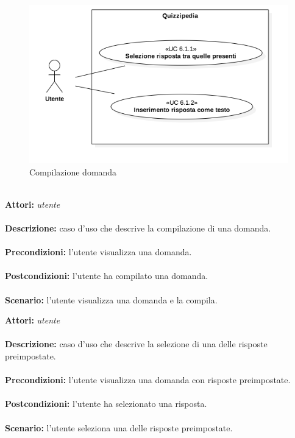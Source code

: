 \documentclass[a4paper,11pt]{article}
\begin{document}
\begin{figure}[h!]
\centering
\includegraphics[scale=0.6]{../immagini/UC6_2.png}
\caption{Compilazione domanda}
\end{figure}
\ \\
\textbf{Attori:} \textit{utente}
\\ \\
\textbf{Descrizione:} caso d'uso che descrive la compilazione di una domanda.\\
\\
\textbf{Precondizioni:} l'utente visualizza una domanda.\\
\\
\textbf{Postcondizioni:} l'utente ha compilato una domanda.\\
\\
\textbf{Scenario:} l’utente visualizza una domanda e la compila.\\



\textbf{Attori:} \textit{utente}
\\ \\
\textbf{Descrizione:} caso d'uso che descrive la selezione di una delle risposte preimpostate.\\
\\
\textbf{Precondizioni:} l'utente visualizza una domanda con risposte preimpostate.\\
\\
\textbf{Postcondizioni:} l'utente ha selezionato una risposta.\\
\\
\textbf{Scenario:} l’utente seleziona una delle risposte preimpostate.\\
\end{document}
